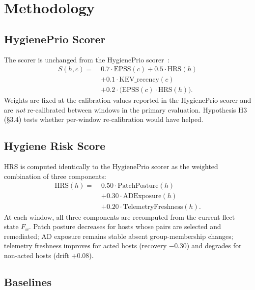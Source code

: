 \section{Methodology}

\subsection{HygienePrio Scorer}

The scorer is unchanged from the HygienePrio scorer~\cite{paper4hygieneprio}:
\begin{equation}
\begin{aligned}
S(h,c) =\;& 0.7 \cdot \mathrm{EPSS}(c) + 0.5 \cdot \mathrm{HRS}(h) \\
 & + 0.1 \cdot \mathrm{KEV\_recency}(c) \\
 & + 0.2 \cdot \bigl(\mathrm{EPSS}(c) \cdot \mathrm{HRS}(h)\bigr).
\end{aligned}
\label{eq:scorer}
\end{equation}
Weights are fixed at the calibration values reported in the HygienePrio scorer and are \textit{not} re-calibrated between windows in the primary evaluation. Hypothesis H3 (\S3.4) tests whether per-window re-calibration would have helped.

\subsection{Hygiene Risk Score}

HRS is computed identically to the HygienePrio scorer as the weighted combination of three components:
\begin{equation}
\begin{aligned}
\mathrm{HRS}(h) =\;& 0.50 \cdot \mathrm{PatchPosture}(h) \\
 & + 0.30 \cdot \mathrm{ADExposure}(h) \\
 & + 0.20 \cdot \mathrm{TelemetryFreshness}(h).
\end{aligned}
\end{equation}
At each window, all three components are recomputed from the current fleet state $F_w$. Patch posture decreases for hosts whose pairs are selected and remediated; AD exposure remains stable absent group-membership changes; telemetry freshness improves for acted hosts (recovery $-0.30$) and degrades for non-acted hosts (drift $+0.08$).

\subsection{Baselines}

